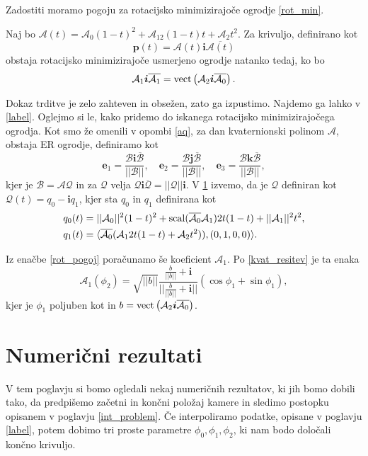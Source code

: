 \documentclass[mat1]{fmfdelo}
\newcommand{\ii}{\boldsymbol i}
\newcommand{\jj}{\boldsymbol j}
\newcommand{\kk}{\boldsymbol k}
\newcommand{\pp}{\boldsymbol p}
\newcommand{\e}{\boldsymbol e}
\newcommand{\A}{\mathcal A}
\newcommand{\B}{\mathcal B}
\newcommand{\QQ}{\mathcal Q}
\begin{document}
	Zadostiti moramo pogoju za rotacijsko minimizirajoče ogrodje \ref{rot_min}.
	\begin{trditev} Naj bo $\A(t) = \A_0(1-t)^2 + \A_12(1-t)t+\A_2t^2$.
		Za krivuljo, definirano kot
		\begin{equation*}
			\pp(t) = \A(t)\ii\overline{\A(t)}
		\end{equation*}
		obstaja rotacijsko minimizirajoče usmerjeno ogrodje natanko tedaj, ko bo
		\begin{equation}{\label{rot_pogoj}}
			\A_1 \ii \overline{\A_1} = {\rm vect} \left(\A_2 \ii \overline{\A_0}\right).
		\end{equation}
	\end{trditev}
\begin{dokaz}
	Dokaz trditve je zelo zahteven in obsežen, zato ga izpustimo. Najdemo ga lahko v \ref{label}. Oglejmo si le, kako pridemo do iskanega rotacijsko minimizirajočega ogrodja. Kot smo že omenili v opombi \ref{aq}, za dan kvaternionski polinom $\A$, obstaja ER ogrodje, definiramo kot
	\begin{equation*}
		\e_1 = \frac{\B \ii \overline{\B}}{||\B||}, \quad \e_2 = \frac{\B \jj \overline{\B}}{||\B||}, \quad		\e_3 = \frac{\B \kk \overline{\B}}{||\B||},
	\end{equation*}
	kjer je $\B = \A \QQ$ in za $\QQ$ velja $\QQ\ii\overline{\QQ}= ||\QQ||\ii$.
	V \ref{} izvemo, da je $\QQ$ definiran kot $\QQ(t)= q_0-\ii q_1$, kjer sta $q_0$ in $q_1$ definirana kot
	\begin{equation}
		\begin{split}
		q_0(t) &= ||\A_0||^2(1-t)^2+{\rm scal} (\overline{\A_0}\A_1) 2t(1-t)+||\A_1||^2t^2, \\
		q_1(t) &=\langle \overline{\A_0} (\A_12t(1-t)+\A_2t^2)),(0,1,0,0) \rangle.
		\end{split}
	\end{equation}
\end{dokaz}
Iz enačbe \ref{rot_pogoj} poračunamo še koeficient $\A_1$. Po \ref{kvat_resitev} je ta enaka
\begin{equation}
	\A_1(\phi_2) = \sqrt{||b||} \frac{\frac{b}{||b||}+ \ii}{||\frac{b}{||b||}+ \ii||} \left(\cos \phi_1 + \sin \phi_1\right),
\end{equation}
kjer je $\phi_1$ poljuben kot in $b = {\rm vect} \left(\A_2 \ii \overline{\A_0}\right)$.



\section{Numerični rezultati}
V tem poglavju si bomo ogledali nekaj numeričnih rezultatov, ki jih bomo dobili tako, da predpišemo začetni in končni položaj kamere in sledimo postopku opisanem v poglavju \ref{int_problem}. Če interpoliramo podatke, opisane v poglavju \ref{label}, potem dobimo tri proste parametre $\phi_0,\phi_1,\phi_2$, ki nam bodo določali končno krivuljo. 
\end{document}
